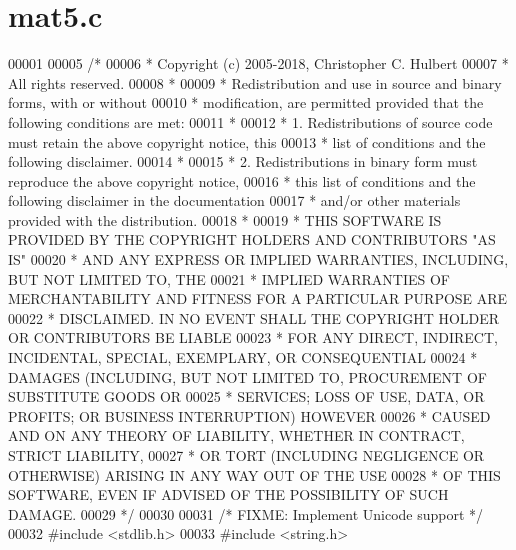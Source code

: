\hypertarget{mat5_8c_source}{}\section{mat5.\+c}
\label{mat5_8c_source}

\begin{DoxyCode}
00001 
00005 \textcolor{comment}{/*}
00006 \textcolor{comment}{ * Copyright (c) 2005-2018, Christopher C. Hulbert}
00007 \textcolor{comment}{ * All rights reserved.}
00008 \textcolor{comment}{ *}
00009 \textcolor{comment}{ * Redistribution and use in source and binary forms, with or without}
00010 \textcolor{comment}{ * modification, are permitted provided that the following conditions are met:}
00011 \textcolor{comment}{ *}
00012 \textcolor{comment}{ * 1. Redistributions of source code must retain the above copyright notice, this}
00013 \textcolor{comment}{ *    list of conditions and the following disclaimer.}
00014 \textcolor{comment}{ *}
00015 \textcolor{comment}{ * 2. Redistributions in binary form must reproduce the above copyright notice,}
00016 \textcolor{comment}{ *    this list of conditions and the following disclaimer in the documentation}
00017 \textcolor{comment}{ *    and/or other materials provided with the distribution.}
00018 \textcolor{comment}{ *}
00019 \textcolor{comment}{ * THIS SOFTWARE IS PROVIDED BY THE COPYRIGHT HOLDERS AND CONTRIBUTORS "AS IS"}
00020 \textcolor{comment}{ * AND ANY EXPRESS OR IMPLIED WARRANTIES, INCLUDING, BUT NOT LIMITED TO, THE}
00021 \textcolor{comment}{ * IMPLIED WARRANTIES OF MERCHANTABILITY AND FITNESS FOR A PARTICULAR PURPOSE ARE}
00022 \textcolor{comment}{ * DISCLAIMED. IN NO EVENT SHALL THE COPYRIGHT HOLDER OR CONTRIBUTORS BE LIABLE}
00023 \textcolor{comment}{ * FOR ANY DIRECT, INDIRECT, INCIDENTAL, SPECIAL, EXEMPLARY, OR CONSEQUENTIAL}
00024 \textcolor{comment}{ * DAMAGES (INCLUDING, BUT NOT LIMITED TO, PROCUREMENT OF SUBSTITUTE GOODS OR}
00025 \textcolor{comment}{ * SERVICES; LOSS OF USE, DATA, OR PROFITS; OR BUSINESS INTERRUPTION) HOWEVER}
00026 \textcolor{comment}{ * CAUSED AND ON ANY THEORY OF LIABILITY, WHETHER IN CONTRACT, STRICT LIABILITY,}
00027 \textcolor{comment}{ * OR TORT (INCLUDING NEGLIGENCE OR OTHERWISE) ARISING IN ANY WAY OUT OF THE USE}
00028 \textcolor{comment}{ * OF THIS SOFTWARE, EVEN IF ADVISED OF THE POSSIBILITY OF SUCH DAMAGE.}
00029 \textcolor{comment}{ */}
00030 
00031 \textcolor{comment}{/* FIXME: Implement Unicode support */}
00032 \textcolor{preprocessor}{#include <stdlib.h>}
00033 \textcolor{preprocessor}{#include <string.h>}

\end{DoxyCode}
